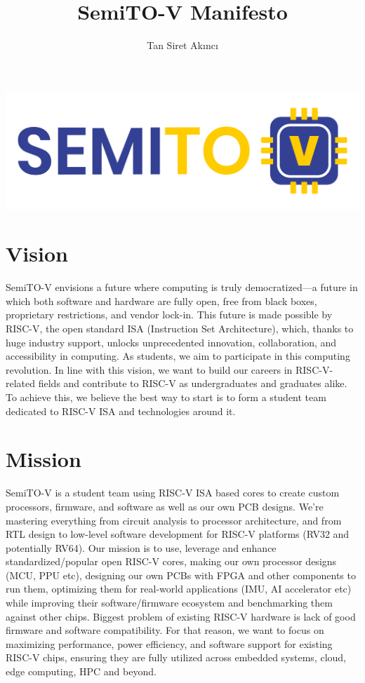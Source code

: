 \documentclass{article}
\title{SemiTO-V Manifesto}
\author{Tan Siret Akıncı}
\date
\begin{document}
\maketitle
\begin{center}
    \includegraphics[scale=0.7]{semito-v_logo.png}
\end{center}
\maketitle

\section{Vision}

SemiTO-V envisions a future where computing is truly democratized—a future in which both software and hardware are fully open, free from black boxes, proprietary restrictions, and vendor lock-in. This future is made possible by RISC-V, the open standard ISA (Instruction Set Architecture), which, thanks to huge industry support, unlocks unprecedented innovation, collaboration, and accessibility in computing. As students, we aim to participate in this computing revolution. In line with this vision, we want to build our careers in RISC-V-related fields and contribute to RISC-V as undergraduates and graduates alike. To achieve this, we believe the best way to start is to form a student team dedicated to RISC-V ISA and technologies around it.


\section{Mission}
SemiTO-V is a student team using RISC-V ISA based cores to create custom processors, firmware, and software as well as our own PCB designs. We’re mastering everything from circuit analysis to processor architecture, and from RTL design to low-level software development for RISC-V platforms (RV32 and potentially RV64). Our mission is to use, leverage and enhance standardized/popular open RISC-V cores, making our own processor designs (MCU, PPU etc), designing our own PCBs with FPGA and other components to run them, optimizing them for real-world applications (IMU, AI accelerator etc) while improving their software/firmware ecosystem and benchmarking them against other chips. Biggest problem of existing RISC-V hardware is lack of good firmware and software compatibility. For that reason, we want to focus on maximizing performance, power efficiency, and software support for existing RISC-V chips, ensuring they are fully utilized across embedded systems, cloud, edge computing, HPC and beyond.
\end{document}
